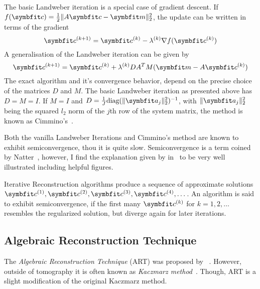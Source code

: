 The basic Landweber iteration is a special case of gradient descent. If \(f(\mvec{c}) = \frac{1}{2}
\norm{A\mvec{c} - \mvec{m}}_2^2\), the update can be written in terms of the gradient
\begin{equation}
	\mvec{c}^{(k+1)} = \mvec{c}^{(k)} - \lambda^{(k)} \nabla f(\mvec{c}^{(k)})
\end{equation}
A generalisation of the Landweber iteration can be given by
\begin{equation}
	\mvec{c}^{(k+1)} = \mvec{c}^{(k)} + \lambda^{(k)} DA^TM(\mvec{m} - A\mvec{c}^{(k)})
\end{equation}
The exact algorithm and it's convergence behavior, depend on the precise choice of the matrices
\(D\) and \(M\). The basic Landweber iteration as presented above has \(D = M = I\). If \(M = I\)
and \(D = \frac{1}{J} \text{diag}(\norm{\mvec{a}_j}^2_2)^{-1}\), with \(\norm{\mvec{a}_j}^2_2\)
being the squared \(l_2\) norm of the \(j\)th row of the system matrix, the method is known as
Cimmino's~\cite[Chapter~6.1]{hansen_discrete_2010}.

Both the vanilla Landweber Iterations and Cimmino's method are known to exhibit semiconvergence,
thou it is quite slow. Semiconvergence is a term coined by Natter~\cite{natterer_mathematics_1986},
however, I find the explanation given by \citeauthor*{hansen_discrete_2010}
in~\cite[Chapter~6]{hansen_discrete_2010} to be very well illustrated including helpful figures.

\begin{definition}[Semiconvergence]\label{def:semiconvergence}
	Iterative Reconstruction algorithms produce a sequence of approximate solutions
	\(\mvec{c}^{(1)}, \mvec{c}^{(2)}, \mvec{c}^{(3)}, \mvec{c}^{(4)}, \dots\). An algorithm is
	said to exhibit semiconvergence, if the first many \(\mvec{c}^{(k)}\) for \(k = 1, 2,
	\dots\) resembles the regularized solution, but diverge again for later iterations.
\end{definition}

\subsection{Algebraic Reconstruction Technique}\label{subsec:algebraic_reconstruction_technique}

The \textit{Algebraic Reconstruction Technique} (ART) was proposed by
\citeauthor*{gordon_algebraic_1970}~\cite{gordon_algebraic_1970}. However, outside of tomography it
is often known as \textit{Kaczmarz method}~\cite{kaczmarz_approximate_1993}. Though, \gls{ART} is a
slight modification of the original Kaczmarz method.

